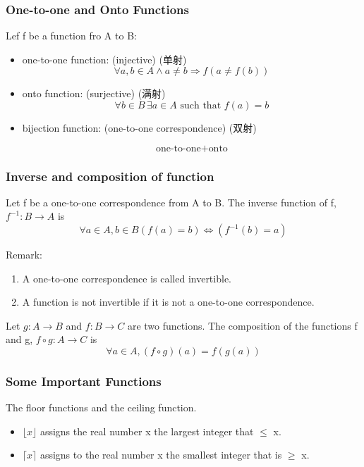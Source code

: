\subsubsection{One-to-one and Onto Functions}
\begin{definition}
    Lef f be a function fro A to B: 
    \begin{itemize}
        \item \textcolor{light_red}{one-to-one function}: (injective) (单射)
        \[ \forall a, b \in A \land a \ne b \Longrightarrow f(a \ne f(b)) \]
        \item \textcolor{light_red}{onto function}: (surjective) (满射)
        \[ \forall b \in B \, \exists a \in A \text{ such that } f(a)=b \]
        \item \textcolor{light_red}{bijection function}:  (one-to-one correspondence) (双射)
        
        \[\text{one-to-one} + \text{onto}\]
    \end{itemize}
\end{definition}

\subsubsection{Inverse and composition of function}
\begin{definition}
    Let f be a one-to-one correspondence from A to B. \textcolor{light_red}{The inverse function} of f, $f^{-1}: B \longrightarrow A$ is 
    \[ \forall a \in A ,b\in B (f(a)=b) \Longleftrightarrow (f^{-1}(b)=a) \]
\end{definition}

Remark: 
\begin{enumerate}
    \item A one-to-one correspondence is called invertible.
    \item A function is not invertible if it is not a one-to-one correspondence. 
\end{enumerate}

\begin{definition}
    Let $g: A \longrightarrow B$ and $f: B \longrightarrow C$ are two functions. \textcolor{light_red}{The composition} of the functions f and g, $f\circ g: A \longrightarrow C$ is 
    \[ \forall a \in A, (f\circ g)(a)=f(g(a)) \]
\end{definition}

\subsubsection{Some Important Functions}
\begin{definition}
    The floor functions and the ceiling function.
    \begin{itemize}
        \item {} $\lfloor x \rfloor$ assigns the real number x the largest integer that $\le$ x.
        \item {} $\lceil x \rceil$ assigns to the real number x the smallest integer that is $\ge$ x. 
    \end{itemize}
\end{definition}

